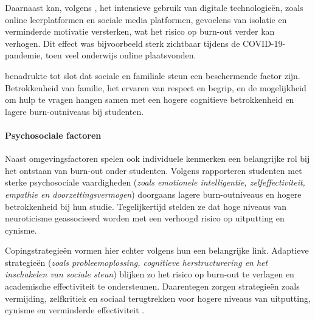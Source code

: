 \vspace{1em}

Daarnaast kan, volgens \textcite{Chong2025}, het intensieve gebruik van digitale technologieën, zoals online leerplatformen en sociale media platformen, gevoelens van isolatie en verminderde motivatie versterken, wat het risico op burn-out verder kan verhogen. Dit effect was bijvoorbeeld sterk zichtbaar tijdens de COVID-19-pandemie, toen veel onderwijs online plaatsvonden. 

\vspace{1em}

\textcite{Chong2025} benadrukte tot slot dat sociale en familiale steun een beschermende factor zijn. Betrokkenheid van familie, het ervaren van respect en begrip, en de mogelijkheid om hulp te vragen hangen samen met een hogere cognitieve betrokkenheid en lagere burn-outniveaus bij studenten.

\vspace{1em}

\paragraph{Psychosociale factoren}

\vspace{1em}

Naast omgevingsfactoren spelen ook individuele kenmerken een belangrijke rol bij het ontstaan van burn-out onder studenten. Volgens \textcite{Chong2025} rapporteren studenten met sterke psychosociale vaardigheden (\textit{zoals emotionele intelligentie, zelfeffectiviteit, empathie en doorzettingsvermogen}) doorgaans lagere burn-outniveaus en hogere betrokkenheid bij hun studie. Tegelijkertijd stelden ze dat hoge niveaus van neuroticisme geassocieerd worden met een verhoogd risico op uitputting en cynisme.

\vspace{1em}

Copingstrategieën vormen hier echter volgens hun een belangrijke link. Adaptieve strategieën (\textit{zoals probleemoplossing, cognitieve herstructurering en het inschakelen van sociale steun}) blijken zo het risico op burn-out te verlagen en academische effectiviteit te ondersteunen. Daarentegen zorgen strategieën zoals vermijding, zelfkritiek en sociaal terugtrekken voor hogere niveaus van uitputting, cynisme en verminderde effectiviteit \autocite{Chong2025}. 

\vspace{1em}

